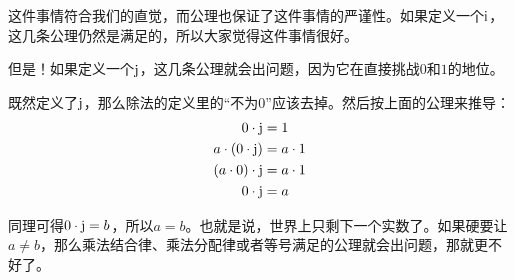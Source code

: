 这件事情符合我们的直觉，而公理也保证了这件事情的严谨性。如果定义一个$\mathrm{i}$，这几条公理仍然是满足的，所以大家觉得这件事情很好。

但是！如果定义一个$\mathrm{j}$，这几条公理就会出问题，因为它在直接挑战$0$和$1$的地位。

既然定义了$\mathrm{j}$，那么除法的定义里的“不为$0$”应该去掉。然后按上面的公理来推导：
\begin{align*}
0 \cdot \mathrm{j}&=1 \\
a \cdot (0 \cdot \mathrm{j})&=a \cdot 1 \\
(a \cdot 0) \cdot \mathrm{j}&=a \cdot 1 \\
0 \cdot \mathrm{j}&=a
\end{align*}

同理可得$0 \cdot \mathrm{j}=b$，所以$a=b$。也就是说，世界上只剩下一个实数了。如果硬要让$a \neq b$，那么乘法结合律、乘法分配律或者等号满足的公理就会出问题，那就更不好了。

